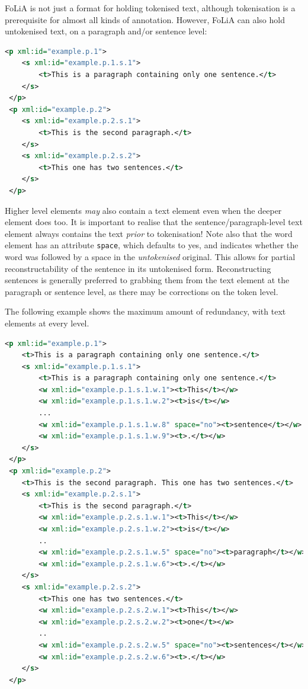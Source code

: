 \documentclass[a4paper,12pt]{report}
\begin{document}
FoLiA is not just a format for holding tokenised text, although tokenisation is a prerequisite for almost all kinds of annotation. However, FoLiA can also hold untokenised text, on a paragraph and/or sentence level:

\begin{lstlisting}[language=xml]
 <p xml:id="example.p.1">
    <s xml:id="example.p.1.s.1">        
        <t>This is a paragraph containing only one sentence.</t>
    </s>
 </p>
 <p xml:id="example.p.2">
    <s xml:id="example.p.2.s.1">     
        <t>This is the second paragraph.</t>
    </s>
    <s xml:id="example.p.2.s.2">     
        <t>This one has two sentences.</t>
    </s>    
 </p>
\end{lstlisting}

Higher level elements \emph{may} also contain a text element even when the deeper element does too. It is important to realise that the sentence/paragraph-level text element always contains the text \emph{prior} to tokenisation! Note also that the word element has an attribute \texttt{space}, which defaults to yes, and indicates whether the word was followed  by a space in the \emph{untokenised} original. This allows for partial reconstructability of the sentence in its  untokenised form. Reconstructing sentences is generally preferred to grabbing them from the text element at the paragraph or sentence level, as there may be corrections on the token level.

The following example shows the maximum amount of redundancy, with text elements at every level.

\begin{lstlisting}[language=xml]
 <p xml:id="example.p.1">
    <t>This is a paragraph containing only one sentence.</t>
    <s xml:id="example.p.1.s.1">        
        <t>This is a paragraph containing only one sentence.</t>
        <w xml:id="example.p.1.s.1.w.1"><t>This</t></w>
        <w xml:id="example.p.1.s.1.w.2"><t>is</t></w>
        ...
        <w xml:id="example.p.1.s.1.w.8" space="no"><t>sentence</t></w>
        <w xml:id="example.p.1.s.1.w.9"><t>.</t></w>
    </s>
 </p>
 <p xml:id="example.p.2">
    <t>This is the second paragraph. This one has two sentences.</t>
    <s xml:id="example.p.2.s.1">
        <t>This is the second paragraph.</t>
        <w xml:id="example.p.2.s.1.w.1"><t>This</t></w>
        <w xml:id="example.p.2.s.1.w.2"><t>is</t></w>    
        ..
        <w xml:id="example.p.2.s.1.w.5" space="no"><t>paragraph</t></w>    
        <w xml:id="example.p.2.s.1.w.6"><t>.</t></w>    
    </s>
    <s xml:id="example.p.2.s.2">
        <t>This one has two sentences.</t>
        <w xml:id="example.p.2.s.2.w.1"><t>This</t></w>
        <w xml:id="example.p.2.s.2.w.2"><t>one</t></w>    
        ..
        <w xml:id="example.p.2.s.2.w.5" space="no"><t>sentences</t></w>    
        <w xml:id="example.p.2.s.2.w.6"><t>.</t></w>    
    </s>
 </p>
\end{lstlisting}
\end{document}
